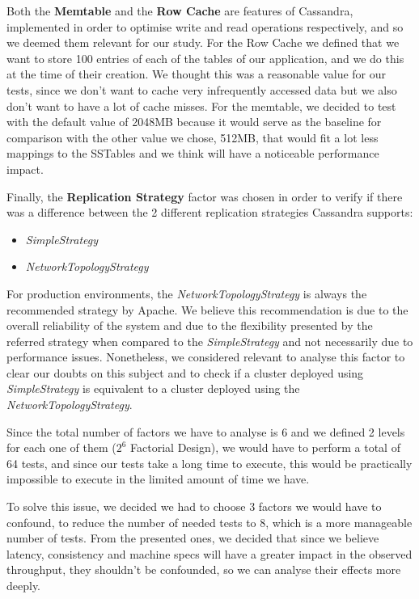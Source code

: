 \documentclass[runningheads]{llncs}
\begin{document}
Both the \textbf{Memtable} and the \textbf{Row Cache} are features of Cassandra, implemented in order to optimise write and read operations respectively, and so we deemed them relevant for our study. For the Row Cache we defined that we want to store 100 entries of each of the tables of our application, and we do this at the time of their creation. We thought this was a reasonable value for our tests, since we don't want to cache very infrequently accessed data but we also don't want to have a lot of cache misses.
For the memtable, we decided to test with the default value of 2048MB because it would serve as the baseline for comparison with the other value we chose, 512MB, that would fit a lot less mappings to the SSTables and we think will have a noticeable performance impact.

Finally, the \textbf{Replication Strategy} factor was chosen in order to verify if there was a difference between the 2 different replication strategies Cassandra supports:

\begin{itemize}
    \item \emph{SimpleStrategy}
    \item \emph{NetworkTopologyStrategy}
\end{itemize}

For production environments, the \emph{NetworkTopologyStrategy} is always the recommended strategy by Apache. We believe this recommendation is due to the overall reliability of the system and due to the flexibility presented by the referred strategy when compared to the \emph{SimpleStrategy} and not necessarily due to performance issues. Nonetheless, we considered relevant to analyse this factor to clear our doubts on this subject and to check if a cluster deployed using \emph{SimpleStrategy} is equivalent to a cluster deployed using the \emph{NetworkTopologyStrategy}.

Since the total number of factors we have to analyse is 6 and we defined 2 levels for each one of them ($2^6$ Factorial Design), we would have to perform a total of 64 tests, and since our tests take a long time to execute, this would be practically impossible to execute in the limited amount of time we have.

To solve this issue, we decided we had to choose 3 factors we would have to confound, to reduce the number of needed tests to 8, which is a more manageable number of tests. From the presented ones, we decided that since we believe latency, consistency and machine specs will have a greater impact in the observed throughput, they shouldn't be confounded, so we can analyse their effects more deeply.
\end{document}
